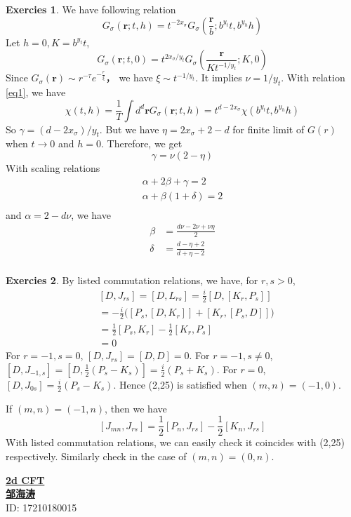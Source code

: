 \documentclass[12pt,a4paper]{article}
\theoremstyle{definition}
\newtheorem{exer}{Exercies}[subsection]
\begin{document}
\begin{exer}
	We have following relation
	\begin{equation}\label{eq1}
	G_{\sigma}(\mathbf{r};t,h) = t^{-2x_{\sigma}}G_\sigma (\frac{\mathbf{r}}{b};b^{y_t}t,b^{y_h}h)
	\end{equation}
	Let $h=0, K= b^{y_t}t$,	
	\[
	G_{\sigma}(\mathbf{r};t,0) = t^{2x_{\sigma}/y_{t}}G_\sigma (\frac{\mathbf{r}}{K t^{-1/y_{t}}};K,0)
	\]
	Since $ G_{\sigma}(\mathbf{r}) \sim r^{-\tau} e^{-\frac{r}{\xi}}$， we have $\xi \sim t^{-1/y_t}$. It implies $\nu = 1/y_t$. With relation \ref{eq1}, we have 
	\[
	\chi(t,h)= \frac{1}{T} \int d^d \mathbf{r} G_\sigma (\mathbf{r};t,h)= t^{d-2x_\sigma} \chi (b^{y_t}t, b^{y_h}h)
	\]
	So $\gamma = (d-2x_\sigma)/y_t$. But we have $\eta = 2 x_\sigma +2 -d$ for finite limit of $G(r)$ when $t \to 0$ and $h=0$. Therefore, we get
	\[
	\gamma = \nu(2-\eta)
	\]With scaling relations
	\[
	\begin{aligned}
	\alpha + 2 \beta + \gamma =2\\
	\alpha + \beta (1+\delta) =2\\
	\end{aligned}
	\]
	and $\alpha = 2 -d \nu$, we have
	\[
	\begin{aligned}
	\beta &= \frac{d\nu -2\nu + \nu \eta}{2}\\
	\delta &= \frac{d-\eta +2}{d+\eta -2}\\
	\end{aligned}
	\]
	\end{exer}
\begin{exer}
	By listed commutation relations, we have, for $r, s > 0$,
	\[
	\begin{aligned}
	&[D, J_{rs}]= [D, L_{rs}] = \frac{i}{2} [D, [K_r, P_s]]\\
	 & =-\frac{i}{2}\big([P_s,[D,K_r]]+ [K_r,[P_s,D]]\big)\\
	 & =\frac{1}{2}[P_s, K_r] -\frac{1}{2}[K_r, P_s]\\
	 &=0
	\end{aligned}
	\]
	For $r=-1,s=0$, $[D,J_{rs}]= [D,D]=0$. For $r=-1, s\neq 0$, $[D,J_{-1,s}]=[D,\frac{1}{2}(P_s - K_s)]= \frac{i}{2}(P_s +K_s)$. For $r=0$, $[D, J_{0s}] = \frac{i}{2}(P_s - K_s)$. Hence (2,25) is satisfied when $(m,n)=(-1,0)$.
	
	If $(m,n)=(-1,n)$, then we have 
	\[
	[J_{mn},J_{rs}] = \frac{1}{2}[P_n, J_{rs}] -\frac{1	}{2} [K_n, J_{rs}]
	\]
	With listed commutation relations, we can easily check it coincides with (2,25) respectively. Similarly check in the case of $(m,n)= (0,n)$. 
\end{exer}
\newpage
\noindent
{\LARGE\underline{\textbf{2d CFT}}}\\
{\hfill\large  \underline{\textbf{邹海涛}} \\
	\hfill ID: 17210180015}\\
\end{document}
